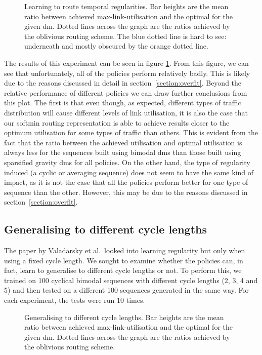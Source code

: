 \begin{figure}
    \centering
    \resizebox{\textwidth}{!}{}
    \caption{Learning to route temporal regularities. Bar heights are the mean ratio between achieved max-link-utilisation and the optimal for the given \ac{dm}. Dotted lines across the graph are the ratios achieved by the oblivious routing scheme. The blue dotted line is hard to see: underneath and mostly obscured by the orange dotted line.}
    \label{fig:exp_cyclic}
\end{figure}

The results of this experiment can be seen in figure \ref{fig:exp_cyclic}. From this figure, we can see that unfortunately, all of the policies perform relatively badly. This is likely due to the reasons discussed in detail in section~\ref{section:overfit}. Beyond the relative performance of different policies we can draw further conclusions from this plot. The first is that even though, as expected, different types of traffic distribution will cause different levels of link utilisation, it is also the case that our softmin routing representation is able to achieve results closer to the optimum utilisation for some types of traffic than others. This is evident from the fact that the ratio between the achieved utilisation and optimal utilisation is always less for the sequences built using bimodal \acp{dm} than those built using sparsified gravity \acp{dm} for all policies. On the other hand, the type of regularity induced (a cyclic or averaging sequence) does not seem to have the same kind of impact, as it is not the case that all the policies perform better for one type of sequence than the other. However, this may be due to the reasons discussed in section~\ref{section:overfit}.

\subsection{Generalising to different cycle lengths}
The paper by Valadarsky et al.\ looked into learning regularity but only when using a fixed cycle length. We sought to examine whether the policies can, in fact, learn to generalise to different cycle lengths or not. To perform this, we trained on 100 cyclical bimodal sequences with different cycle lengths (2, 3, 4 and 5) and then tested on a different 100 sequences generated in the same way. For each experiment, the tests were run 10 times.

\begin{figure}
    \centering
    \resizebox{\textwidth}{!}{}
    \caption{Generalising to different cycle lengths. Bar heights are the mean ratio between achieved max-link-utilisation and the optimal for the given \ac{dm}. Dotted lines across the graph are the ratios achieved by the oblivious routing scheme.}
    \label{fig:exp_vary}
\end{figure}

